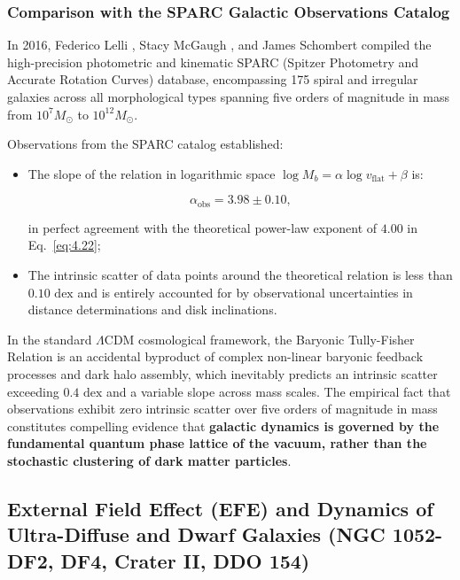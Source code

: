 \subsubsection{Comparison with the SPARC Galactic Observations Catalog}

In 2016, Federico Lelli \cite{ref26}, Stacy McGaugh \cite{ref27}, and James Schombert compiled the high-precision photometric and kinematic SPARC (Spitzer Photometry and Accurate Rotation Curves) database, encompassing 175 spiral and irregular galaxies across all morphological types spanning five orders of magnitude in mass from $10^7 M_\odot$ to $10^{12} M_\odot$.

Observations from the SPARC catalog established:

\begin{itemize}
\item The slope of the relation in logarithmic space $\log M_b = \alpha \log v_{\text{flat}} + \beta$ is:

\begin{equation*}
\alpha_{\text{obs}} = \mathbf{3.98 \pm 0.10},
\end{equation*}

in perfect agreement with the theoretical power-law exponent of \textbf{$4.00$} in Eq.~\eqref{eq:4.22};

\item The intrinsic scatter of data points around the theoretical relation is less than $0.10\text{ dex}$ and is entirely accounted for by observational uncertainties in distance determinations and disk inclinations.
\end{itemize}

In the standard $\Lambda\text{CDM}$ cosmological framework, the Baryonic Tully-Fisher Relation is an accidental byproduct of complex non-linear baryonic feedback processes and dark halo assembly, which inevitably predicts an intrinsic scatter exceeding $0.4\text{ dex}$ and a variable slope across mass scales. The empirical fact that observations exhibit zero intrinsic scatter over five orders of magnitude in mass constitutes compelling evidence that \textbf{galactic dynamics is governed by the fundamental quantum phase lattice of the vacuum, rather than the stochastic clustering of dark matter particles}.


\subsection{External Field Effect (EFE) and Dynamics of Ultra-Diffuse and Dwarf Galaxies (NGC 1052-DF2, DF4, Crater II, DDO 154)}\label{sec:4.3}

